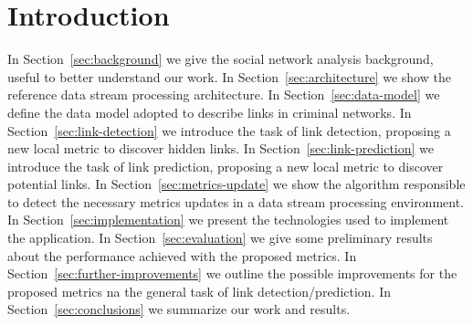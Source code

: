 \section{Introduction}
\label{sec:introduction}

In Section~\ref{sec:background} we give the social network analysis background, useful to better understand our work.
In Section~\ref{sec:architecture} we show the reference data stream processing architecture.
In Section~\ref{sec:data-model} we define the data model adopted to describe links in criminal networks.
In Section~\ref{sec:link-detection} we introduce the task of link detection, proposing a new local metric to discover hidden links.
In Section~\ref{sec:link-prediction} we introduce the task of link prediction, proposing a new local metric to discover potential links.
In Section~\ref{sec:metrics-update} we show the algorithm responsible to detect the necessary metrics updates in a data stream processing environment.
In Section~\ref{sec:implementation} we present the technologies used to implement the application.
In Section~\ref{sec:evaluation} we give some preliminary results about the performance achieved with the proposed metrics.
In Section~\ref{sec:further-improvements} we outline the possible improvements for the proposed metrics na the general task of link detection/prediction.
In Section~\ref{sec:conclusions} we summarize our work and results.
